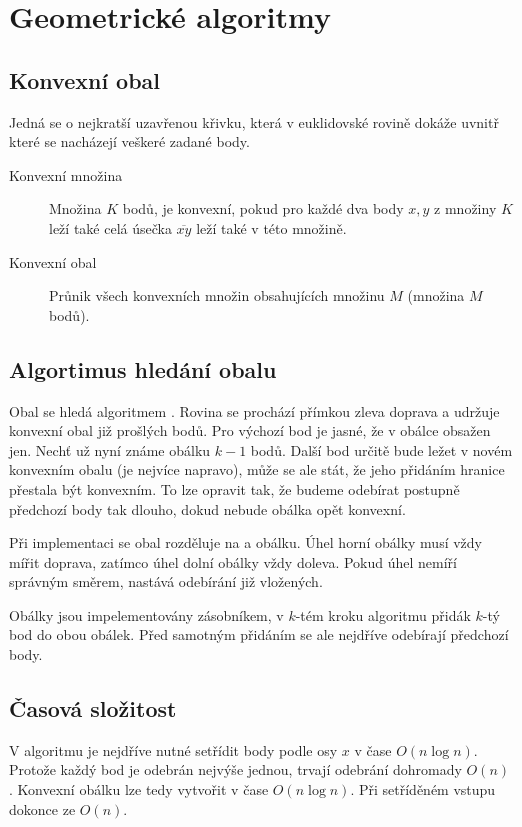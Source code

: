\section{Geometrické algoritmy}

\subsection{Konvexní obal}

Jedná se o nejkratší uzavřenou křivku, která v euklidovské rovině dokáže uvnitř které se nacházejí veškeré zadané body.

\begin{description}
    \item[Konvexní množina] Množina $K$ bodů, je konvexní, pokud pro každé dva body $x, y$ z množiny $K$ leží také celá úsečka $\overline{xy}$ leží také v této množině.
    \item[Konvexní obal] Průnik všech konvexních množin obsahujících množinu $M$ (množina $M$ bodů).
\end{description}

\subsection{Algortimus hledání obalu}

Obal se hledá algoritmem .
Rovina se prochází přímkou zleva doprava a udržuje konvexní obal již prošlých bodů.
Pro výchozí bod je jasné, že v obálce obsažen jen.
Nechť už nyní známe obálku $k-1$ bodů.
Další bod určitě bude ležet v novém konvexním obalu (je nejvíce napravo), může se ale stát, že jeho přidáním hranice přestala být konvexním.
To lze opravit tak, že budeme odebírat postupně předchozí body tak dlouho, dokud nebude obálka opět konvexní.

Při implementaci se obal rozděluje na  a  obálku.
Úhel horní obálky musí vždy mířit doprava, zatímco úhel dolní obálky vždy doleva.
Pokud úhel nemíří správným směrem, nastává odebírání již vložených.

Obálky jsou impelementovány zásobníkem, v $k$-tém kroku algoritmu přidák $k$-tý bod do obou obálek.
Před samotným přidáním se ale nejdříve odebírají předchozí body.

\subsection{Časová složitost}

V algoritmu je nejdříve nutné setřídit body podle osy $x$ v čase $O(n \log{n})$.
Protože každý bod je odebrán nejvýše jednou, trvají odebrání dohromady $O(n)$.
Konvexní obálku lze tedy vytvořit v čase $O(n \log{n})$.
Při setříděném vstupu dokonce ze $O(n)$.

